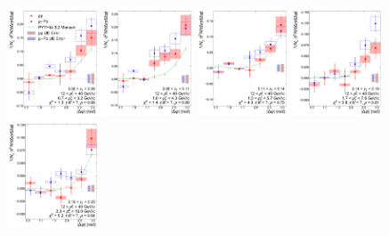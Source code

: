  \begin{figure}
     \centering
     \includegraphics[width=0.24\textwidth]{Data_Analysis/gammahadron/Cs_Final_Indv_pT_0_zT_0.pdf}
    \includegraphics[width=0.24\textwidth]{Data_Analysis/gammahadron/Cs_Final_Indv_pT_0_zT_1.pdf}        
    \includegraphics[width=0.24\textwidth]{Data_Analysis/gammahadron/Cs_Final_Indv_pT_0_zT_2.pdf}        
    \includegraphics[width=0.24\textwidth]{Data_Analysis/gammahadron/Cs_Final_Indv_pT_0_zT_3.pdf}        
    \includegraphics[width=0.24\textwidth]{Data_Analysis/gammahadron/Cs_Final_Indv_pT_0_zT_4.pdf}        

\end{figure}
